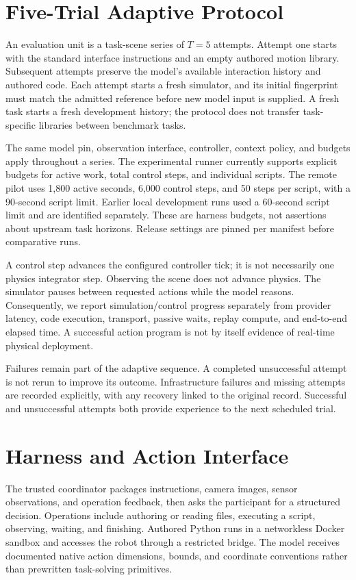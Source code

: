 \documentclass[11pt]{article}
\begin{document}
\section{Five-Trial Adaptive Protocol}
An evaluation unit is a task-scene series of $T=5$ attempts. Attempt one starts with the standard interface instructions and an empty authored motion library. Subsequent attempts preserve the model's available interaction history and authored code. Each attempt starts a fresh simulator, and its initial fingerprint must match the admitted reference before new model input is supplied. A fresh task starts a fresh development history; the protocol does not transfer task-specific libraries between benchmark tasks.

The same model pin, observation interface, controller, context policy, and budgets apply throughout a series. The experimental runner currently supports explicit budgets for active work, total control steps, and individual scripts. The remote pilot uses 1,800 active seconds, 6,000 control steps, and 50 steps per script, with a 90-second script limit. Earlier local development runs used a 60-second script limit and are identified separately. These are harness budgets, not assertions about upstream task horizons. Release settings are pinned per manifest before comparative runs.

A control step advances the configured controller tick; it is not necessarily one physics integrator step. Observing the scene does not advance physics. The simulator pauses between requested actions while the model reasons. Consequently, we report simulation/control progress separately from provider latency, code execution, transport, passive waits, replay compute, and end-to-end elapsed time. A successful action program is not by itself evidence of real-time physical deployment.

Failures remain part of the adaptive sequence. A completed unsuccessful attempt is not rerun to improve its outcome. Infrastructure failures and missing attempts are recorded explicitly, with any recovery linked to the original record. Successful and unsuccessful attempts both provide experience to the next scheduled trial.

\section{Harness and Action Interface}
The trusted coordinator packages instructions, camera images, sensor observations, and operation feedback, then asks the participant for a structured decision. Operations include authoring or reading files, executing a script, observing, waiting, and finishing. Authored Python runs in a networkless Docker sandbox and accesses the robot through a restricted bridge. The model receives documented native action dimensions, bounds, and coordinate conventions rather than prewritten task-solving primitives.
\end{document}
